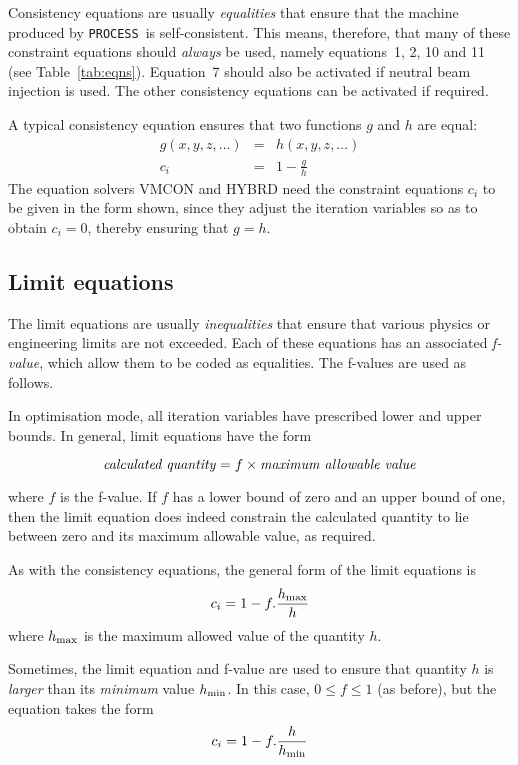 \documentclass[11pt,a4paper]{report}
\newcommand{\process}{\mbox{\texttt{PROCESS}}}
\begin{document}
Consistency equations are usually \textit{equalities}\/ that ensure that the
machine produced by \process\ is self-consistent. This means, therefore, that
many of these constraint equations should \textit{always}\/ be used, namely
equations~1, 2, 10 and 11 (see Table~\ref{tab:eqns}).  Equation~7 should also
be activated if neutral beam injection is used.  The other consistency
equations can be activated if required.

A typical consistency equation ensures that two functions $g$ and $h$ are
equal:
\begin{eqnarray*}
g(x,y,z,\ldots) & = & h(x,y,z,\ldots) \\
c_i & = & 1 - \frac{g}{h}
\end{eqnarray*}
The equation solvers VMCON and HYBRD need the constraint equations $c_i$ to be
given in the form shown, since they adjust the iteration variables so as to
obtain $c_i = 0$, thereby ensuring that $g = h$.

\subsection{Limit equations}

The limit equations are usually \textit{inequalities}\/ that ensure that
various physics or engineering limits are not exceeded. Each of these
equations has an associated \textit{f-value}, which allow them to be coded as
equalities. The f-values are used as follows.

In optimisation mode, all iteration variables have prescribed lower and upper
bounds. In general, limit equations have the form

\[ \mbox{\textit{calculated quantity}} = f \times \mbox{\textit{maximum allowable
value}} \]

where $f$ is the f-value. If $f$ has a lower bound of zero and an upper bound
of one, then the limit equation does indeed constrain the calculated quantity
to lie between zero and its maximum allowable value, as required.

As with the consistency equations, the general form of the limit equations is
\[ c_i = 1 - f.\frac{h_{\mbox{\scriptsize max}}}{h} \]
where $h_{\mbox{\scriptsize max}}$ is the maximum allowed value of the quantity $h$.

Sometimes, the limit equation and f-value are used to ensure that quantity $h$
is \textit{larger}\/ than its \textit{minimum}\/ value $h_{\mbox{\scriptsize min}}$. In
this case, $0 \leq f \leq 1$ (as before), but the equation takes the form
\[ c_i = 1 - f.\frac{h}{h_{\mbox{\scriptsize min}}} \]
\end{document}
